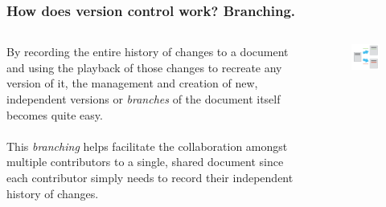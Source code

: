 \documentclass{beamer}
\begin{document}
\begin{frame}
   \frametitle{How does version control work? Branching.}
   \begin{columns}
      \begin{column}{0.5\textwidth}
         By recording the entire history of changes to a document and 
         using the playback of those changes to recreate any version of 
         it, the management and creation of new, independent versions
         or \textit{branches} of the document itself becomes quite easy.
         \\ \ \\
         This \textit{branching} helps facilitate the collaboration 
         amongst multiple contributors to a single, shared document 
         since each contributor simply needs to record their 
         independent history of changes.
      \end{column}
      \hfill
      \begin{column}{0.5\textwidth}
         \begin{figure}[htbp]
            \includegraphics[width=1.0\textwidth]{images/creating-different-versions.png}
         \end{figure}
      \end{column}
   \end{columns}
\end{frame}
\end{document}
